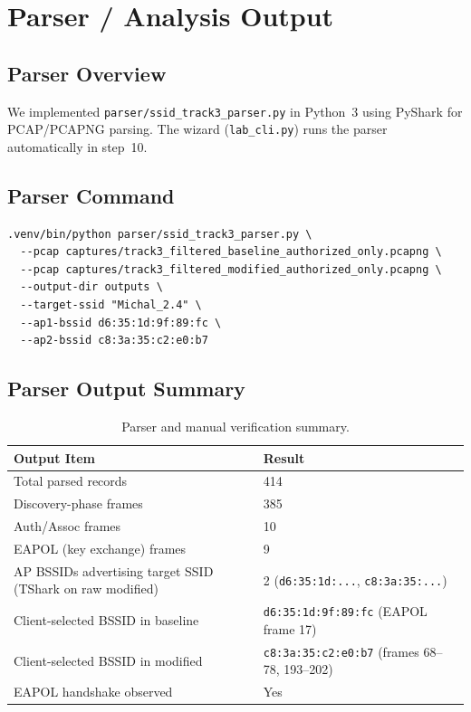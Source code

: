 \documentclass[12pt,a4paper]{article}
\begin{document}
\section{Parser / Analysis Output}

\subsection{Parser Overview}

We implemented \texttt{parser/ssid\_track3\_parser.py} in Python~3 using PyShark for PCAP/PCAPNG parsing. The wizard (\texttt{lab\_cli.py}) runs the parser automatically in step~10.

\subsection{Parser Command}

\begin{lstlisting}
.venv/bin/python parser/ssid_track3_parser.py \
  --pcap captures/track3_filtered_baseline_authorized_only.pcapng \
  --pcap captures/track3_filtered_modified_authorized_only.pcapng \
  --output-dir outputs \
  --target-ssid "Michal_2.4" \
  --ap1-bssid d6:35:1d:9f:89:fc \
  --ap2-bssid c8:3a:35:c2:e0:b7
\end{lstlisting}

\subsection{Parser Output Summary}

\begin{table}[H]
\centering
\begin{tabular}{|p{5cm}|p{8cm}|}
\hline
\textbf{Output Item} & \textbf{Result} \\
\hline
Total parsed records & 414 \\
\hline
Discovery-phase frames & 385 \\
\hline
Auth/Assoc frames & 10 \\
\hline
EAPOL (key exchange) frames & 9 \\
\hline
AP BSSIDs advertising target SSID (TShark on raw modified) & 2 (\texttt{d6:35:1d:...}, \texttt{c8:3a:35:...}) \\
\hline
Client-selected BSSID in baseline & \texttt{d6:35:1d:9f:89:fc} (EAPOL frame 17) \\
\hline
Client-selected BSSID in modified & \texttt{c8:3a:35:c2:e0:b7} (frames 68--78, 193--202) \\
\hline
EAPOL handshake observed & Yes \\
\hline
\end{tabular}
\caption{Parser and manual verification summary.}
\end{table}
\end{document}
